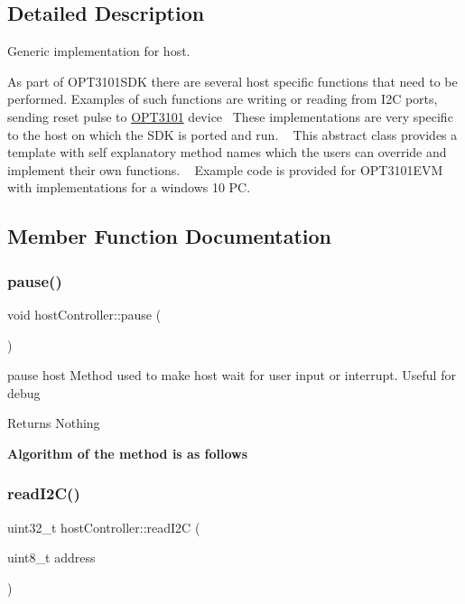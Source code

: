 \subsection{Detailed Description}
Generic implementation for host. 

As part of O\+P\+T3101\+S\+DK there are several host specific functions that need to be performed. Examples of such functions are writing or reading from I2C ports, sending reset pulse to \mbox{\hyperlink{namespace_o_p_t3101}{O\+P\+T3101}} device~\newline
 These implementations are very specific to the host on which the S\+DK is ported and run. ~\newline
 This abstract class provides a template with self explanatory method names which the users can override and implement their own functions. ~\newline
 Example code is provided for O\+P\+T3101\+E\+VM with implementations for a windows 10 PC. 

\subsection{Member Function Documentation}
\mbox{\label{classhost_controller_aead6dcbe7d02d5b2ae92b5cde1d99f05}} 
\subsubsection{\texorpdfstring{pause()}{pause()}}
{\footnotesize\ttfamily void host\+Controller\+::pause (\begin{DoxyParamCaption}{ }\end{DoxyParamCaption})}



pause host Method used to make host wait for user input or interrupt. Useful for debug 

\begin{DoxyReturn}{Returns}
Nothing 
\end{DoxyReturn}
{\bfseries Algorithm of the method is as follows} \mbox{\label{classhost_controller_a2bee6b3ec45fac241484f7dad943d8ed}} 
\subsubsection{\texorpdfstring{read\+I2\+C()}{readI2C()}}
{\footnotesize\ttfamily uint32\+\_\+t host\+Controller\+::read\+I2C (\begin{DoxyParamCaption}\item[{uint8\+\_\+t}]{address }\end{DoxyParamCaption})}



